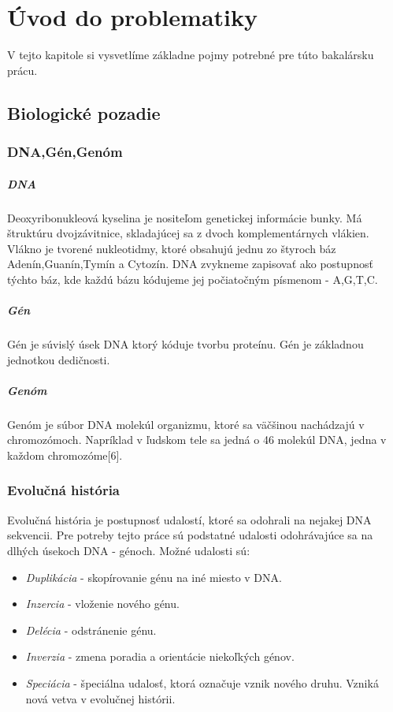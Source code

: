 \chapter{Úvod do problematiky}
V tejto kapitole si vysvetlíme základne pojmy potrebné pre túto bakalársku prácu.
\section{Biologické pozadie}
\subsection{DNA,Gén,Genóm}
\paragraph{DNA}
Deoxyribonukleová kyselina je nositeľom genetickej informácie bunky. Má štruktúru dvojzávitnice, skladajúcej sa z dvoch komplementárnych vlákien.
Vlákno je tvorené nukleotidmy, ktoré obsahujú jednu zo štyroch báz Adenín,Guanín,Tymín a Cytozín.
DNA zvykneme zapisovať ako postupnosť týchto báz, kde každú bázu kódujeme jej počiatočným písmenom - A,G,T,C.

\paragraph{Gén}
Gén je súvislý úsek DNA ktorý kóduje tvorbu proteínu. Gén je základnou jednotkou dedičnosti.

\paragraph{Genóm}
Genóm je súbor DNA molekúl organizmu, ktoré sa väčšinou nachádzajú v chromozómoch.
Napríklad v ľudskom tele sa jedná o 46 molekúl DNA, jedna v každom chromozóme[6].

\subsection{Evolučná história} \label{evhist}
Evolučná história je postupnosť udalostí, ktoré sa odohrali na nejakej DNA sekvencii.
Pre potreby tejto práce sú podstatné udalosti odohrávajúce sa na dlhých úsekoch DNA - génoch.
\newline
Možné udalosti sú:
\newline
\begin{itemize}
\item \emph{Duplikácia} - skopírovanie génu na iné miesto v DNA.
\item \emph{Inzercia} - vloženie nového génu.
\item \emph{Delécia} - odstránenie génu.
\item \emph{Inverzia} - zmena poradia a orientácie niekoľkých génov.
\item \emph{Speciácia} - špeciálna udalosť, ktorá označuje vznik nového druhu. Vzniká nová vetva v evolučnej histórii.
\end{itemize}

